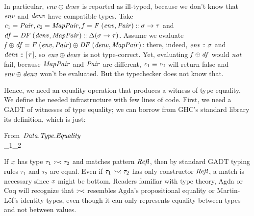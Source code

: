 In particular, \ensuremath{\Varid{env}\oplus \Varid{denv}} is reported as ill-typed, because we don't
know that \ensuremath{\Varid{env}} and \ensuremath{\Varid{denv}} have compatible types. Take \ensuremath{\Varid{c}_{1}\mathrel{=}\Conid{Pair},\Varid{c}_{2}\mathrel{=}\Conid{MapPair},\Varid{f}\mathrel{=}\Conid{F}\;(\Varid{env},\Conid{Pair})\mathrel{:\mkern-1mu:}\sigma\to \tau} and \ensuremath{\Varid{df}\mathrel{=}\Conid{DF}\;(\Varid{denv},\Conid{MapPair})\mathrel{:\mkern-1mu:}\Delta (\sigma\to \tau)}. Assume we evaluate \ensuremath{\Varid{f}\oplus \Varid{df}\mathrel{=}\Conid{F}\;(\Varid{env},\Conid{Pair})\oplus \Conid{DF}\;(\Varid{denv},\Conid{MapPair})}: there, indeed, \ensuremath{\Varid{env}\mathrel{:\mkern-1mu:}\sigma} and \ensuremath{\Varid{denv}\mathrel{:\mkern-1mu:}[\mskip1.5mu \tau\mskip1.5mu]}, so
\ensuremath{\Varid{env}\oplus \Varid{denv}} is not type-correct. Yet, evaluating \ensuremath{\Varid{f}\oplus \Varid{df}} would
\emph{not} fail, because \ensuremath{\Conid{MapPair}} and \ensuremath{\Conid{Pair}} are different, \ensuremath{\Varid{c}_{1}\equiv\Varid{c}_{2}} will
return false and \ensuremath{\Varid{env}\oplus \Varid{denv}} won't be evaluated. But the typechecker does
not know that.

Hence, we need an equality operation that produces a witness of type equality. We
define the needed infrastructure with few lines of code. First, we need a GADT
of witnesses of type equality; we can borrow from GHC's standard library its
definition, which is just:

\begin{hscode}\SaveRestoreHook
{}%
%
%
\>[B]{}\mbox{\onelinecomment  From \ensuremath{\Conid{\Conid{Data}.\Conid{Type}.Equality}}}{}\<[E]%
\\
\>[B]{}\;\tau_{1}\mathrel{:\mkern-1mu\sim\mkern-1mu:}\tau_{2}\;\<[E]%
\\
\>[B]{}\<[3]%
\>[3]{}\mathrel{:\mkern-1mu:}\tau\mathrel{:\mkern-1mu\sim\mkern-1mu:}\tau{}\<[E]%
\ColumnHook
\end{hscode}\resethooks
If \ensuremath{\Varid{x}} has type \ensuremath{\tau_{1}\mathrel{:\mkern-1mu\sim\mkern-1mu:}\tau_{2}} and matches pattern \ensuremath{\Conid{Refl}}, then by standard
GADT typing rules \ensuremath{\tau_{1}} and \ensuremath{\tau_{2}} are equal.
Even if \ensuremath{\tau_{1}\mathrel{:\mkern-1mu\sim\mkern-1mu:}\tau_{2}} has only constructor \ensuremath{\Conid{Refl}}, a match is necessary
since \ensuremath{\Varid{x}} might be bottom. Readers familiar with type theory, Agda or Coq will
recognize that \ensuremath{\mathrel{:\mkern-1mu\sim\mkern-1mu:}} resembles Agda's propositional equality or Martin-Löf's
identity types, even though it can only represents equality between types and
not between values.

